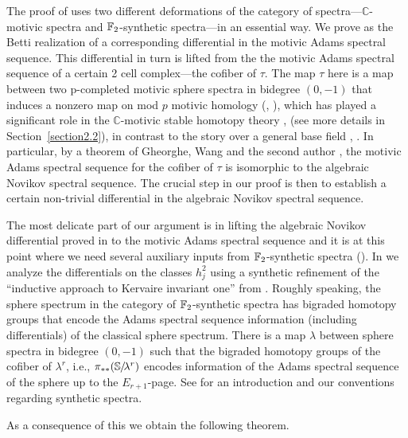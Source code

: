 The proof of  uses two different deformations of the category of spectra---$\mathbb{C}$-motivic spectra and $\operatorname{\mathbb{F}}_2$-synthetic spectra---in an essential way. 
We prove  as the Betti realization of a corresponding differential in the motivic Adams spectral sequence. This differential in turn is lifted from the the motivic Adams spectral sequence of a certain 2 cell complex---the cofiber of $\tau$. The map $\tau$ here is a map between two p-completed motivic sphere spectra in bidegree $(0,-1)$ that induces a nonzero map on mod $p$ motivic homology (\cite{Voe032}, \cite{HuKrizOrmsby}), which has played a significant role in the $\mathbb{C}$-motivic stable homotopy theory \cite{Isaksen}, \cite{IWX} (see more details in Section~\ref{section2.2}), in contrast to the story over a general base field \cite{rmot}, \cite{BKWX}.  In particular, 
by a theorem of Gheorghe, Wang and the second author \cite[Theorem~1.3]{GWX},
the motivic Adams spectral sequence for the cofiber of $\tau$ is isomorphic to
the algebraic Novikov spectral sequence.
The crucial step in our proof is then to establish a certain non-trivial differential in the algebraic Novikov spectral sequence.

The most delicate part of our argument is in lifting the algebraic Novikov differential proved in  to the motivic Adams spectral sequence and it is at this point where we need several auxiliary inputs from $\operatorname{\mathbb{F}}_2$-synthetic spectra (\cite{Pstragowski}). In  we analyze the differentials on the classes $h_j^2$ using a synthetic refinement of the ``inductive approach to Kervaire invariant one'' from \cite{Inductive}. Roughly speaking, the sphere spectrum in the category of $\operatorname{\mathbb{F}}_2$-synthetic spectra has bigraded homotopy groups that encode the Adams spectral sequence information (including differentials) of the classical sphere spectrum. There is a map $\lambda$ between sphere spectra in bidegree $(0,-1)$ such that the bigraded homotopy groups of the cofiber of $\lambda^r$, i.e., $\pi_{**}(\operatorname{\mathbb{S}}\hspace{-2.2pt}/\!\lambda^r)$ encodes information of the Adams spectral sequence of the sphere up to the $E_{r+1}$-page. See  for an introduction and our conventions regarding synthetic spectra.

As a consequence of this we obtain the following theorem.



